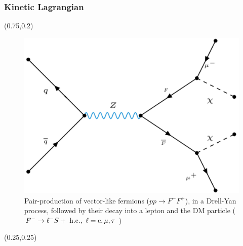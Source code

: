 \documentclass{beamer}
\begin{document}
\begin{frame}
\frametitle{Kinetic Lagrangian}

\begin{textblock*}{0.5\linewidth}(0.75\linewidth,0.2\linewidth) %

\begin{figure}[!tbp]
\centering
\includegraphics[width=1\textwidth]{pictures/DYVLFNoJet}
\caption{{\scriptsize Pair-production of vector-like fermions ($p p \to F^- F^+ $),
in a Drell-Yan process, followed by their decay into a lepton and the DM particle ($F^- \to \ell^- S +\rm{\ h.c.},\ \ell=e,\mu,\tau$ )}}
\label{TowFerminon}
\end{figure}
\end{textblock*}

\begin{textblock*}{0.46 \linewidth}(0.25\linewidth,0.25\linewidth) %
{\small {}}
\end{textblock*}

\end{frame}
\end{document}
